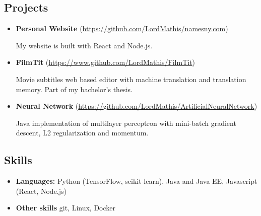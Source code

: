 \documentclass[a4,12pt]{article}
\providecommand{\tightlist}{%
  \setlength{\itemsep}{0pt}\setlength{\parskip}{0pt}}
\begin{document}
\subsection*{Projects}\label{projects}

\begin{itemize}

\item
  \textbf{Personal Website} (\href{https://github.com/LordMathis/namesny.com}{https://github.com/LordMathis/namesny.com})
  
  My website is built with React and Node.js.

\item
  \textbf{FilmTit} (\href{https://www.github.com/LordMathis/FilmTit}{https://www.github.com/LordMathis/FilmTit})

  Movie subtitles web based editor with machine translation and
  translation memory. Part of my bachelor's thesis.
  
\item
    \textbf{Neural Network} (\href{https://github.com/LordMathis/ArtificialNeuralNetwork}{https://github.com/LordMathis/ArtificialNeuralNetwork})

    Java implementation of multilayer perceptron with mini-batch gradient descent, L2 regularization and momentum.

\end{itemize}

\subsection*{Skills}\label{skills}

\begin{itemize}
\tightlist
\item
  \textbf{Languages:} Python (TensorFlow, scikit-learn), Java and Java EE, Javascript (React, Node.js)
\item
  \textbf{Other skills} git, Linux, Docker
\end{itemize}
\end{document}
